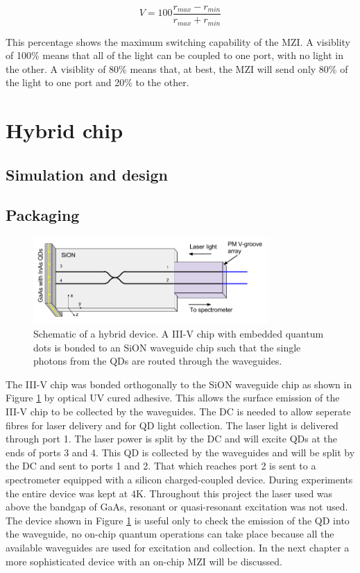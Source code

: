 \begin{equation} V = 100 \frac{r_{max} - r_{min}}{r_{max} + r_{min}}
\end{equation}

This percentage shows the maximum switching capability of the MZI. A visiblity
of 100\% means that all of the light can be coupled to one port, with no light
in the other. A visiblity of 80\% means that, at best, the MZI will send only
80\% of the light to one port and 20\% to the other.

\section{Hybrid chip}

\subsection{Simulation and design}

\subsection{Packaging}

\begin{figure}[h!] \begin{center}
\includegraphics[width=0.8\textwidth]{images/hyb_basic.png} \caption{Schematic
of a hybrid device. A III-V chip with embedded quantum dots is bonded to an SiON
waveguide chip such that the single photons from the QDs are routed through the
waveguides.} \label{fig:hyb_basic} \end{center} \end{figure}

The III-V chip was bonded orthogonally to the SiON waveguide chip as shown in
Figure \ref{fig:hyb_basic} by optical UV cured adhesive. This allows the surface
emission of the III-V chip to be collected by the waveguides. The DC is needed
to allow seperate fibres for laser delivery and for QD light collection. The
laser light is delivered through port 1. The laser power is split by the DC and
will excite QDs at the ends of ports 3 and 4. This QD is collected by the
waveguides and will be split by the DC and sent to ports 1 and 2. That which
reaches port 2 is sent to a spectrometer equipped with a silicon charged-coupled
device. During experiments the entire device was kept at 4K. Throughout this
project the laser used was above the bandgap of GaAs, resonant or quasi-resonant
excitation was not used. The device shown in Figure \ref{fig:hyb_basic} is
useful only to check the emission of the QD into the waveguide, no on-chip
quantum operations can take place because all the available waveguides are used
for excitation and collection. In the next chapter a more sophisticated device
with an on-chip MZI will be discussed.

